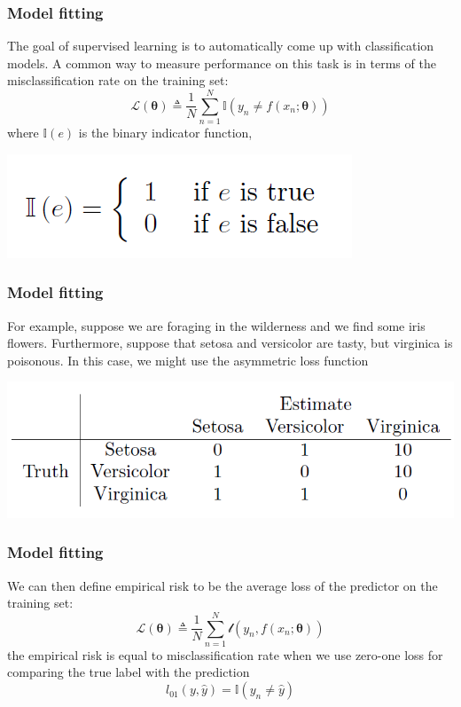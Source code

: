 \documentclass[spanish]{beamer}
\begin{document}
\begin{frame}
\frametitle{Model fitting}
The goal of supervised learning is to automatically come up with classification models. A common way to
measure performance on this task is in terms of the misclassification rate on the training set:
\begin{equation*}
\mathcal{L}(\mathbf{\theta}) \triangleq \frac{1}{N} \sum_{n=1}^{N}{\mathbb{I}(y_{n}\neq f(x_{n};\mathbf{\theta})) }
\end{equation*}
where $\mathbb{I}(e)$ is the binary indicator function,
\begin{center}
\includegraphics[scale=0.5]{im8}
\end{center}
\end{frame}
\begin{frame}
\frametitle{Model fitting}
For example, suppose we are foraging in the wilderness and we find some iris flowers.
Furthermore, suppose that setosa and versicolor are tasty, but virginica is poisonous. In this case, we
might use the asymmetric loss function
\begin{center}
\includegraphics[scale=0.4]{im9}
\end{center}
\end{frame}
\begin{frame}
\frametitle{Model fitting}
We can then define empirical risk to be the average loss of the predictor on the training set:
\begin{equation*}
\mathcal{L}(\mathbf{\theta}) \triangleq \frac{1}{N} \sum_{n=1}^{N}{\mathscr{l}(y_{n}, f(x_{n};\mathbf{\theta})) }
\end{equation*}
the empirical risk is equal to misclassification rate when we use zero-one loss for comparing the true label with the prediction
\begin{equation*}
\textit{l}_{01}(y,\hat{y})= \mathbb{I}(y_{n}\neq \hat{y}) 
\end{equation*} 

\end{frame}
\end{document}
